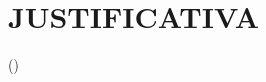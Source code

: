 
\chapter{JUSTIFICATIVA}
\label{chap:justifiativa}

\lipsum[6-7] (\citeyear{Angelica})

\lipsum[8-9]
\cite{Leggieri2018a}

\lipsum[10-11]
\cite{DeMarco2019,Prausnitz,Goulart2019}

\begin{citacao}
	\lipsum[12]
	\cite{Rocha2011,Leggieri2018a,Costa2007,Wei2009,Boudouh2016,Costa2012,Costa2009}
\end{citacao}


